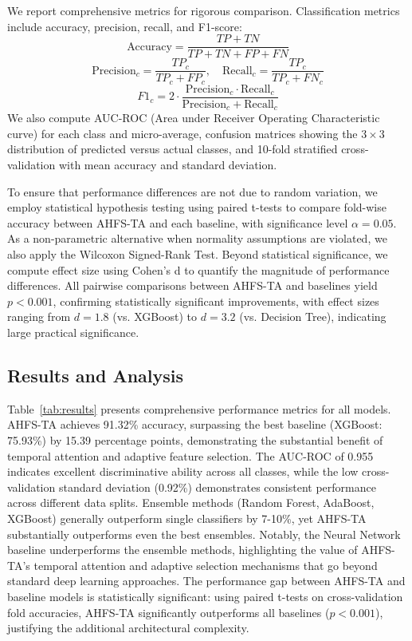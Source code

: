 \documentclass[journal]{IEEEtran}
\begin{document}
We report comprehensive metrics for rigorous comparison. Classification metrics include accuracy, precision, recall, and F1-score:
\begin{equation}
\text{Accuracy} = \frac{TP + TN}{TP + TN + FP + FN}
\end{equation}
\begin{equation}
\text{Precision}_c = \frac{TP_c}{TP_c + FP_c}, \quad \text{Recall}_c = \frac{TP_c}{TP_c + FN_c}
\end{equation}
\begin{equation}
F1_c = 2 \cdot \frac{\text{Precision}_c \cdot \text{Recall}_c}{\text{Precision}_c + \text{Recall}_c}
\end{equation}
We also compute AUC-ROC (Area under Receiver Operating Characteristic curve) for each class and micro-average, confusion matrices showing the $3 \times 3$ distribution of predicted versus actual classes, and 10-fold stratified cross-validation with mean accuracy and standard deviation.

To ensure that performance differences are not due to random variation, we employ statistical hypothesis testing using paired t-tests to compare fold-wise accuracy between AHFS-TA and each baseline, with significance level $\alpha = 0.05$. As a non-parametric alternative when normality assumptions are violated, we also apply the Wilcoxon Signed-Rank Test. Beyond statistical significance, we compute effect size using Cohen's d to quantify the magnitude of performance differences. All pairwise comparisons between AHFS-TA and baselines yield $p < 0.001$, confirming statistically significant improvements, with effect sizes ranging from $d = 1.8$ (vs. XGBoost) to $d = 3.2$ (vs. Decision Tree), indicating large practical significance.

\subsection{Results and Analysis}

Table~\ref{tab:results} presents comprehensive performance metrics for all models. AHFS-TA achieves 91.32\% accuracy, surpassing the best baseline (XGBoost: 75.93\%) by 15.39 percentage points, demonstrating the substantial benefit of temporal attention and adaptive feature selection. The AUC-ROC of 0.955 indicates excellent discriminative ability across all classes, while the low cross-validation standard deviation (0.92\%) demonstrates consistent performance across different data splits. Ensemble methods (Random Forest, AdaBoost, XGBoost) generally outperform single classifiers by 7-10\%, yet AHFS-TA substantially outperforms even the best ensembles. Notably, the Neural Network baseline underperforms the ensemble methods, highlighting the value of AHFS-TA's temporal attention and adaptive selection mechanisms that go beyond standard deep learning approaches. The performance gap between AHFS-TA and baseline models is statistically significant: using paired t-tests on cross-validation fold accuracies, AHFS-TA significantly outperforms all baselines ($p < 0.001$), justifying the additional architectural complexity.
\end{document}
